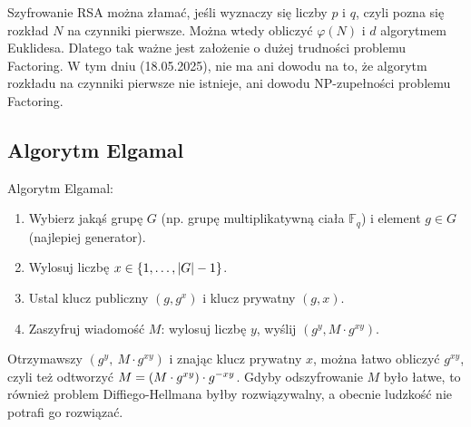 Szyfrowanie RSA można złamać, jeśli wyznaczy się liczby \( p \) i \( q \), czyli pozna się rozkład \( N \) na czynniki pierwsze.
Można wtedy obliczyć \( \varphi(N) \) i \( d \) algorytmem Euklidesa. Dlatego tak ważne jest założenie o dużej trudności problemu Factoring.
W tym dniu (18.05.2025), nie ma ani dowodu na to, że algorytm rozkładu na czynniki pierwsze nie istnieje, ani dowodu NP-zupełności problemu Factoring.

\subsection{Algorytm Elgamal}
\begin{greyframe}
	Algorytm Elgamal:
	\begin{enumerate}
		\item Wybierz jakąś grupę \( G \) (np. grupę multiplikatywną ciała \( \mathbb{F}_q \)) i element \( g \in G \) \\ (najlepiej generator).
		\item Wylosuj liczbę \( x \in \set{1, \ldots, \abs{G}-1} \).
		\item Ustal klucz publiczny \( (g,g^x) \) i klucz prywatny \( (g,x) \).
		\item Zaszyfruj wiadomość \( M \): wylosuj liczbę \( y \), wyślij \( (g^y, M \cdot g^{xy}) \).
	\end{enumerate}
\end{greyframe}
Otrzymawszy \( (g^y, \ M \cdot g^{xy}) \) i znając klucz prywatny \( x \), można łatwo obliczyć \( g^{xy} \), czyli też odtworzyć \( M = \left(M \cdot g^{xy}\right) \cdot g^{-xy} \).
Gdyby odszyfrowanie \( M \) było łatwe, to również problem Diffiego-Hellmana byłby rozwiązywalny, a obecnie ludzkość nie potrafi go rozwiązać.